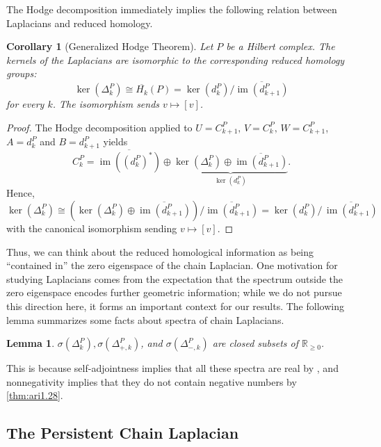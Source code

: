 \documentclass[11pt]{article}
\newtheorem{cor}[theorem]{Corollary}
\newtheorem{lemma}[theorem]{Lemma}
\theoremstyle{definition}
\theoremstyle{remark}
\DeclareMathOperator{\im}{im}
\newcommand{\R}{\mathbb{R}}
\begin{document}
The Hodge decomposition immediately implies the following relation between Laplacians and reduced homology.

\begin{cor}[Generalized Hodge Theorem] \label{thm:ker_hom_1}
    Let $P$ be a Hilbert complex. The kernels of the Laplacians are isomorphic to the corresponding reduced homology groups:
    $$
        \ker(\Delta_k^{P}) \cong \overline{H_k}(P) = \ker(d^P_k) / \overline{\im (d^P_{k+1})}
    $$
    for every $k$. The isomorphism sends $v \mapsto [v]$.
\end{cor} 
\begin{proof}
    The Hodge decomposition applied to $U=C_{k+1}^P,\, V=C_k^P,\, W=C_{k+1}^P$, $A=d_k^P$ and $B=d_{k+1}^P$ yields
    $$
        C_k^P = \overline{\im\left(\left(d_k^P\right)^*\right)} \oplus \underbrace{\ker\left(\Delta_k^{P} \right)\oplus \overline{\im\left(d_{k+1}^{P} \right)}}_{\ker\left(d_k^P \right)}.
    $$
    Hence,
   $$
        \ker\left(\Delta_k^{P} \right)\cong\left(\ker\left(\Delta_k^{P} \right)\oplus \overline{\im\left(d_{k+1}^{P} \right)}\right) \big/ \overline{\im\left(d_{k+1}^{P} \right)} = \ker\left(d_k^P\right) \big/ \, \overline{\im\left(d_{k+1}^{P} \right)}
    $$
    with the canonical isomorphism sending $v \mapsto [v]$. 
\end{proof}

Thus, we can think about the reduced homological information as being ``contained in'' the zero eigenspace of the chain Laplacian. One motivation for studying Laplacians comes from the expectation that the spectrum outside the zero eigenspace encodes further geometric information; while we do not pursue this direction here, it forms an important context for our results. 
The following lemma summarizes some facts about spectra of chain Laplacians.

\begin{lemma} \label{lem:properties}
$\sigma(\Delta_k^P), \sigma(\Delta_{+,k}^P)$, and $\sigma(\Delta_{-,k}^P)$ are closed subsets of $\R_{\ge 0}$.
\end{lemma}

This is because self-adjointness implies that all these spectra are real by \citet[Lemma 1.6]{schroedingerop}, and nonnegativity implies that they do not contain negative numbers by \cref{thm:ari1.28}. 

\subsection{The Persistent Chain Laplacian} \label{sec:perslap}
\end{document}
